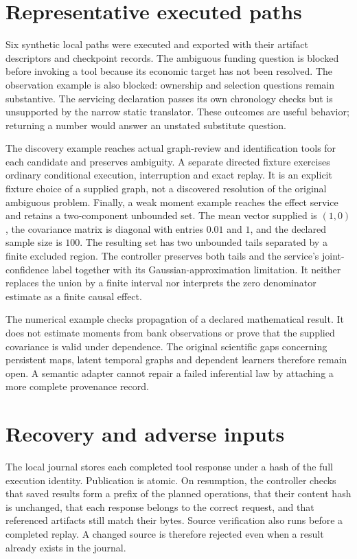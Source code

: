 \section{Representative executed paths}

Six synthetic local paths were executed and exported with their artifact
descriptors and checkpoint records. The ambiguous funding question is blocked
before invoking a tool because its economic target has not been resolved. The
observation example is also blocked: ownership and selection questions remain
substantive. The servicing declaration passes its own chronology checks but is
unsupported by the narrow static translator. These outcomes are useful behavior;
returning a number would answer an unstated substitute question.

The discovery example reaches actual graph-review and identification tools for
each candidate and preserves ambiguity. A separate directed fixture exercises
ordinary conditional execution, interruption and exact replay. It is an explicit
fixture choice of a supplied graph, not a discovered resolution of the original
ambiguous problem. Finally, a weak moment example reaches the effect service
and retains a two-component unbounded set. The mean vector supplied is $(1,0)$,
the covariance matrix is diagonal with entries $0.01$ and $1$, and the declared
sample size is $100$. The resulting set has two unbounded tails separated by a
finite excluded region. The controller preserves both tails and the service's
joint-confidence label together with its Gaussian-approximation limitation.
It neither replaces the union by a finite interval nor interprets the zero
denominator estimate as a finite causal effect.

The numerical example checks propagation of a declared mathematical result.
It does not estimate moments from bank observations or prove that the supplied
covariance is valid under dependence. The original scientific gaps concerning
persistent maps, latent temporal graphs and dependent learners therefore remain
open. A semantic adapter cannot repair a failed inferential law by attaching a
more complete provenance record.

\section{Recovery and adverse inputs}

The local journal stores each completed tool response under a hash of the full
execution identity. Publication is atomic. On resumption, the controller
checks that saved results form a prefix of the planned operations, that their
content hash is unchanged, that each response belongs to the correct request,
and that referenced artifacts still match their bytes. Source verification also
runs before a completed replay. A changed source is therefore rejected even
when a result already exists in the journal.

